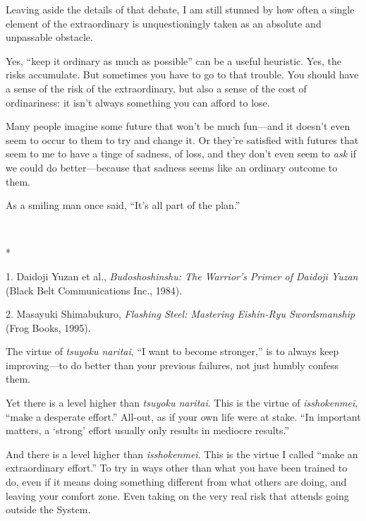 {
 Leaving aside the details of that debate, I am still stunned by
how often a single element of the extraordinary is unquestioningly
taken as an absolute and unpassable obstacle.}

{
 Yes, ``keep it ordinary as much as
possible'' can be a useful heuristic. Yes, the risks
accumulate. But sometimes you have to go to that trouble. You should
have a sense of the risk of the extraordinary, but also a sense of the
cost of ordinariness: it isn't always something you can
afford to lose.}

{
 Many people imagine some future that won't be much
fun---and it doesn't even seem to occur to them to try
and change it. Or they're satisfied with futures that
seem to me to have a tinge of sadness, of loss, and they
don't even seem to \textit{ask} if we could do
better---because that sadness seems like an ordinary outcome to them.}

{
 As a smiling man once said,
``It's all part of the
plan.''}

{\centering
 \ ~
\par}

{\centering
 *
\par}


\bigskip

{
 1. Daidoji Yuzan et al., \textit{Budoshoshinshu: The
Warrior's Primer of Daidoji Yuzan} (Black Belt
Communications Inc., 1984).}

{
 2. Masayuki Shimabukuro, \textit{Flashing Steel: Mastering
Eishin-Ryu Swordsmanship} (Frog Books, 1995).}


{
 The virtue of \textit{tsuyoku naritai}, ``I want
to become stronger,'' is to always keep
improving---to do better than your previous failures, not just humbly
confess them. }

{
 Yet there is a level higher than \textit{tsuyoku naritai}. This is
the virtue of \textit{isshokenmei}, ``make a desperate
effort.'' All-out, as if your own life were at stake.
``In important matters, a
`strong' effort usually only results in
mediocre results.''}

{
 And there is a level higher than \textit{isshokenmei}. This is the
virtue I called ``make an extraordinary
effort.'' To try in ways other than what you have
been trained to do, even if it means doing something different from
what others are doing, and leaving your comfort zone. Even taking on
the very real risk that attends going outside the System.}


